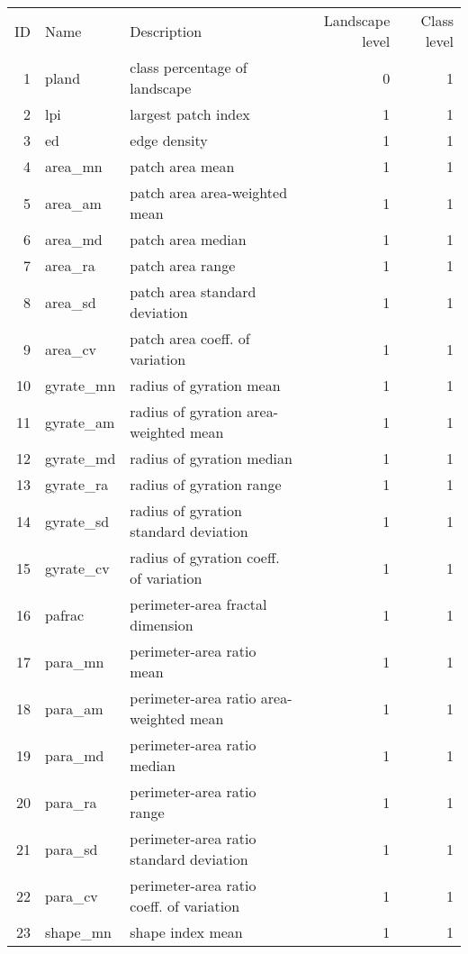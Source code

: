 \begin{longtable}{rllrr}
  \hline
ID & Name & Description & Landscape level & Class level \\ 
   1 & pland & class percentage of landscape &   0 &   1 \\ 
    2 & lpi & largest patch index &   1 &   1 \\ 
    3 & ed & edge density &   1 &   1 \\ 
    4 & area\_mn & patch area mean &   1 &   1 \\ 
    5 & area\_am & patch area area-weighted mean &   1 &   1 \\ 
    6 & area\_md & patch area median &   1 &   1 \\ 
    7 & area\_ra & patch area range &   1 &   1 \\ 
    8 & area\_sd & patch area standard deviation &   1 &   1 \\ 
    9 & area\_cv & patch area coeff. of variation &   1 &   1 \\ 
   10 & gyrate\_mn & radius of gyration mean &   1 &   1 \\ 
   11 & gyrate\_am & radius of gyration area-weighted mean &   1 &   1 \\ 
   12 & gyrate\_md & radius of gyration median &   1 &   1 \\ 
   13 & gyrate\_ra & radius of gyration range &   1 &   1 \\ 
   14 & gyrate\_sd & radius of gyration standard deviation &   1 &   1 \\ 
   15 & gyrate\_cv & radius of gyration coeff. of variation &   1 &   1 \\ 
   16 & pafrac & perimeter-area fractal dimension &   1 &   1 \\ 
   17 & para\_mn & perimeter-area ratio mean &   1 &   1 \\ 
   18 & para\_am & perimeter-area ratio area-weighted mean &   1 &   1 \\ 
   19 & para\_md & perimeter-area ratio median &   1 &   1 \\ 
   20 & para\_ra & perimeter-area ratio range &   1 &   1 \\ 
   21 & para\_sd & perimeter-area ratio standard deviation &   1 &   1 \\ 
   22 & para\_cv & perimeter-area ratio coeff. of variation &   1 &   1 \\ 
   23 & shape\_mn & shape index mean &   1 &   1 \\ 

\end{longtable}
